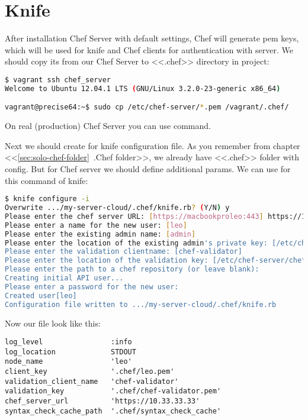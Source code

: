 \section{Knife}

After installation Chef Server with default settings, Chef will generate pem keys, which will be used for knife and Chef clients for authentication with server. We should copy its from our Chef Server to <<.chef>> directory in project:

\begin{lstlisting}[language=Bash,label=lst:my-server-cloud-knife1]
$ vagrant ssh chef_server
Welcome to Ubuntu 12.04.1 LTS (GNU/Linux 3.2.0-23-generic x86_64)

vagrant@precise64:~$ sudo cp /etc/chef-server/*.pem /vagrant/.chef/
\end{lstlisting}

On real (production) Chef Server you can use  command.

Next we should create for knife configuration file. As you remember from chapter <<\ref{sec:solo-chef-folder}~.Chef folder>>, we already have <<.chef>> folder with  config. But for Chef server we should define additional params. We can use for this  command of knife:

\begin{lstlisting}[language=Bash,label=lst:my-server-cloud-knife2]
$ knife configure -i
Overwrite .../my-server-cloud/.chef/knife.rb? (Y/N) y
Please enter the chef server URL: [https://macbookproleo:443] https://10.33.33.33
Please enter a name for the new user: [leo]
Please enter the existing admin name: [admin]
Please enter the location of the existing admin's private key: [/etc/chef-server/admin.pem] .chef/admin.pem
Please enter the validation clientname: [chef-validator]
Please enter the location of the validation key: [/etc/chef-server/chef-validator.pem] .chef/chef-validator.pem
Please enter the path to a chef repository (or leave blank):
Creating initial API user...
Please enter a password for the new user:
Created user[leo]
Configuration file written to .../my-server-cloud/.chef/knife.rb
\end{lstlisting}

Now our file look like this:

\begin{lstlisting}[label=lst:my-server-cloud-knife3,title=my-server-cloud/.chef/knife.rb]
log_level                :info
log_location             STDOUT
node_name                'leo'
client_key               '.chef/leo.pem'
validation_client_name   'chef-validator'
validation_key           '.chef/chef-validator.pem'
chef_server_url          'https://10.33.33.33'
syntax_check_cache_path  '.chef/syntax_check_cache'
\end{lstlisting}

